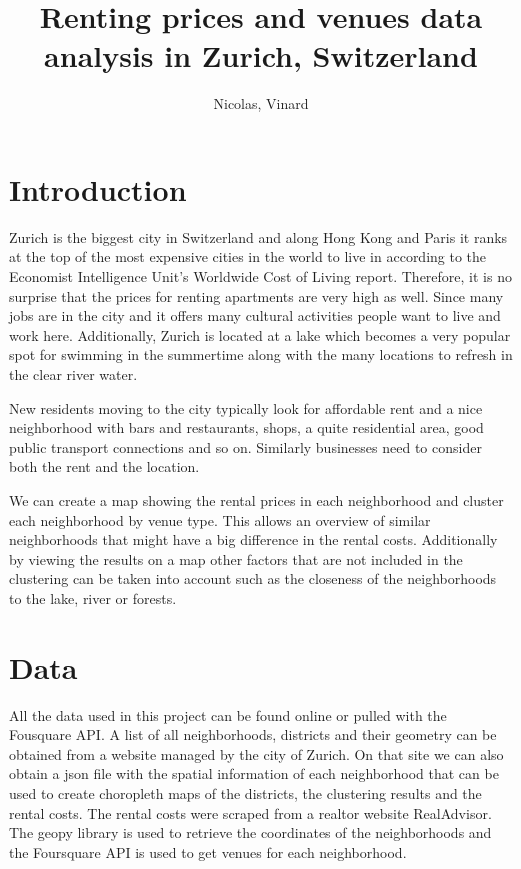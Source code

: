 \documentclass[a4paper,12pt,english]{article}
\title{Renting prices and venues data analysis in Zurich, Switzerland}
\author{Nicolas, Vinard}
\begin{document}
\maketitle

\section{Introduction}
Zurich is the biggest city in Switzerland and along Hong Kong and Paris it ranks at the top of the most expensive cities in the world to live in according to the Economist Intelligence Unit's Worldwide Cost of Living report. Therefore, it is no surprise that the prices for renting apartments are very high as well. Since many jobs are in the city and it offers many cultural activities people want to live and work here. Additionally, Zurich is located at a lake which becomes a very popular spot for swimming in the summertime along with the many locations to refresh in the clear river water. \par
New residents moving to the city typically look for affordable rent and a nice neighborhood with bars and restaurants, shops, a quite residential area, good public transport connections and so on. Similarly businesses need to consider both the rent and the location. \par
We can create a map showing the rental prices in each neighborhood and cluster each neighborhood by venue type. This allows an overview of similar neighborhoods that might have a big difference in the rental costs. Additionally by viewing the results on a map other factors that are not included in the clustering can be taken into account such as the closeness of the neighborhoods to the lake, river or forests.

\section{Data}
All the data used in this project can be found online or pulled with the Fousquare API. A list of all neighborhoods, districts and their geometry can be obtained from a website managed by the city of Zurich. On that site we can also obtain a json file with the spatial information of each neighborhood that can be used to create choropleth maps of the districts, the clustering results and the rental costs. The rental costs were scraped from a realtor website RealAdvisor. The geopy library is used to retrieve the coordinates of the neighborhoods and the Foursquare API is used to get venues for each neighborhood.
\end{document}
